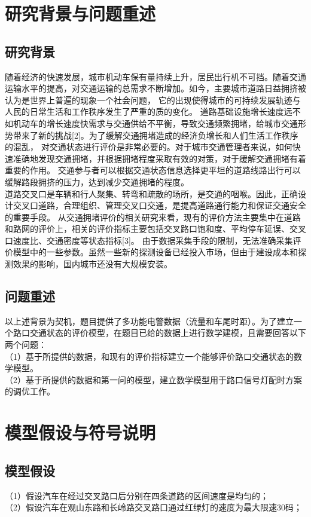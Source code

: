 \documentclass[UTF8][12pt]{article}
\begin{document}
    \section{研究背景与问题重述}
    \subsection{研究背景}
    随着经济的快速发展，城市机动车保有量持续上升，居民出行机不可挡。随着交通运输水平的提高，对交通运输的总需求不断增加。如今，主要城市道路日益拥挤被认为是世界上普遍的现象一个社会问题，
    它的出现使得城市的可持续发展轨迹与人民的日常生活和工作秩序发生了严重的质的变化。
    道路基础设施增长速度远不如机动车的增长速度快需求与交通供给不平衡，导致交通频繁拥堵，给城市交通形势带来了新的挑战[2]。为了缓解交通拥堵造成的经济负增长和人们生活工作秩序的混乱，
    对交通状态进行评价是非常必要的。对于城市交通管理者来说，如何快速准确地发现交通拥堵，并根据拥堵程度采取有效的对策，对于缓解交通拥堵有着重要的作用。
    交通参与者可以根据交通状态信息选择更平坦的道路线路出行可以缓解路段拥挤的压力，达到减少交通拥堵的程度。\\
    道路交叉口是车辆和行人聚集、转弯和疏散的场所，是交通的咽喉。因此，正确设计交叉口道路，合理组织、管理交叉口交通，是提高道路通行能力和保证交通安全的重要手段。
    从交通拥堵评价的相关研究来看，现有的评价方法主要集中在道路和路网的评价上，相关的评价指标主要包括交叉路口饱和度、平均停车延误、交叉口速度比、交通密度等状态指标[3]。
    由于数据采集手段的限制，无法准确采集评价模型中的一些参数。虽然一些新的探测设备已经投入市场，但由于建设成本和探测效果的影响，国内城市还没有大规模安装。\\
    \subsection{问题重述}
    以上述背景为契机，题目提供了多功能电警数据（流量和车尾时距）。为了建立一个路口交通状态的评价模型，在题目已给的数据上进行数学建模，且需要回答以下两个问题：\\
    （1）基于所提供的数据，和现有的评价指标建立一个能够评价路口交通状态的数学模型。\\
    （2）基于所提供的数据和第一问的模型，建立数学模型用于路口信号灯配时方案的调优工作。
    \section{模型假设与符号说明}
    \subsection{模型假设}
    （1）假设汽车在经过交叉路口后分别在四条道路的区间速度是均匀的；\\
    （2）假设汽车在观山东路和长岭路交叉路口通过红绿灯的速度为最大限速30码；\\
\end{document}
